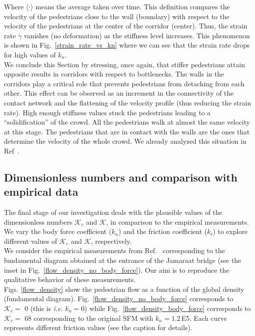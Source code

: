\documentclass[preprint,12pt]{elsarticle}
\begin{document}
Where $\langle \cdot \rangle$ means the average taken over time. This definition
compares the velocity of the pedestrians close to the wall (boundary) with
respect to the velocity of the pedestrians at the center of the corridor
(center). Thus, the strain rate $\dot{\gamma}$ vanishes (no deformation) as the
stiffness level increases. This phenomenon is shown in
Fig.~\ref{strain_rate_vs_kn} where we can see that the strain rate drops for
high values of $k_n$. \\


We conclude this Section by stressing, once again, that stiffer pedestrians
attain opposite results in corridors with respect to bottlenecks. The walls in
the corridors play a critical role that prevents pedestrians from detaching from
each other. This effect can be observed as an increment in the connectivity
of the contact network and the flattening of the velocity profile (thus reducing
the strain rate). High enough stiffness values stuck the pedestrians
leading to a ``solidification'' of the crowd. All the pedestrians walk at almost
the same velocity at this stage. The pedestrians that are in contact with the
walls are the ones that determine the velocity of the whole crowd. We already
analyzed this situation in Ref~\cite{dorso_2019}. \\

\subsection{\label{Dimensionless}Dimensionless numbers and comparison
 with empirical data}


The final stage of our investigation deals with the plausible values of the
dimensionless numbers $\mathcal{K}_c$ and $\mathcal{K}$, in comparison to the
empirical measurements. We vary the body force coefficient ($k_n$) and the
friction coefficient ($k_t$) to explore different values of $\mathcal{K}_c$ and
$\mathcal{K}$, respectively.\\

We consider the empirical measurements from Ref.~\cite{helbing_2007}
corresponding to the fundamental diagram obtained at the entrance of the
Jamaraat bridge (see the inset in Fig.~\ref{flow_density_no_body_force}). Our
aim is to reproduce the qualitative behavior of these measurements.\\

Figs. \ref{flow_density} show the pedestrian flow as a function of the global
density (fundamental diagram). Fig.~\ref{flow_density_no_body_force} corresponds
to $\mathcal{K}_c=$ 0 (this is \textit{i.e.} $k_n=0$) while
Fig.~\ref{flow_density_body_force} corresponds to $\mathcal{K}_c=$ 68
corresponding to the original SFM with $k_n=1.2\,$E5. Each curve represents
different friction values (see the caption for details).\\
\end{document}
